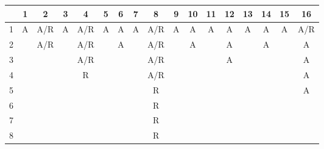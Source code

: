 \begin{table}[h]
	\centering
	\small
	{
		\setlength{\tabcolsep}{.5em}
		\begin{tabular}{|c|c|c|c|c|c|c|c|c|c|c|c|c|c|c|c|c|}
			\hline
			\diagbox[width=3em]{$n$}{$m$} & 1 & 2 & 3 & 4 & 5 & 6 & 7 & 8 & 9 & 10 & 11 & 12 & 13 & 14 & 15 & 16  \\
			\hline
			1 & \cellcolor{e-count-for} A & \cellcolor{e-count-for} A/R & \cellcolor{e-count-for} A & \cellcolor{e-count-for} A/R & \cellcolor{e-count-for} A & \cellcolor{e-count-for} A & \cellcolor{e-count-for} A & \cellcolor{e-count-for} A/R & \cellcolor{e-count-for} A & \cellcolor{e-count-for} A & \cellcolor{e-count-for} A & \cellcolor{e-count-for} A & \cellcolor{e-count-for} A & \cellcolor{e-count-for} A & \cellcolor{e-count-for} A & \cellcolor{e-count-for} A/R \\
			\hline
			2 & \cellcolor{e-count-emp} & \cellcolor{e-count-emp} A/R & \cellcolor{e-count-emp} & \cellcolor{e-count-emp} A/R & \cellcolor{e-count-emp} & \cellcolor{e-count-emp} A & \cellcolor{e-count-emp} & \cellcolor{e-count-emp} A/R & & A & & A & & A & & A \\
			\hline
			3 & \cellcolor{ne-proof} & \cellcolor{e-count-emp} & \cellcolor{e-count-emp} & \cellcolor{e-count-emp} A/R & \cellcolor{e-count-emp} & \cellcolor{e-examples} & \cellcolor{e-examples} & \cellcolor{e-examples} A/R & & & & A & & & & A \\
			\hline
			4 & \cellcolor{ne-proof} & \cellcolor{ne-empir} & \cellcolor{e-count-emp} & \cellcolor{e-examples} R & \cellcolor{e-examples} & \cellcolor{e-examples} & \cellcolor{e-examples} & \cellcolor{e-examples} A/R & & & & & & & & A \\
			\hline
			5 & \cellcolor{ne-proof} & \cellcolor{ne-proof} & \cellcolor{ne-empir} & \cellcolor{e-examples} & & & & \cellcolor{e-examples} R & & & & & & & & A \\
			\hline
			6 & \cellcolor{ne-proof} & \cellcolor{ne-proof} & \cellcolor{ne-empir} & \cellcolor{ne-conjc} & & & & \cellcolor{e-examples} R & & & & & & & & \\
			\hline
			7 & \cellcolor{ne-proof} & \cellcolor{ne-proof} & \cellcolor{ne-proof} & \cellcolor{ne-conjc} & \cellcolor{ne-conjc} & & & \cellcolor{e-examples} R & & & & & & & & \\
			\hline
			8 & \cellcolor{ne-proof} & \cellcolor{ne-proof} & \cellcolor{ne-proof} & \cellcolor{ne-conjc} & \cellcolor{ne-conjc} & \cellcolor{ne-conjc} & & \cellcolor{e-examples} R & & & & & & & & \\

\end{tabular}}
\end{table}
